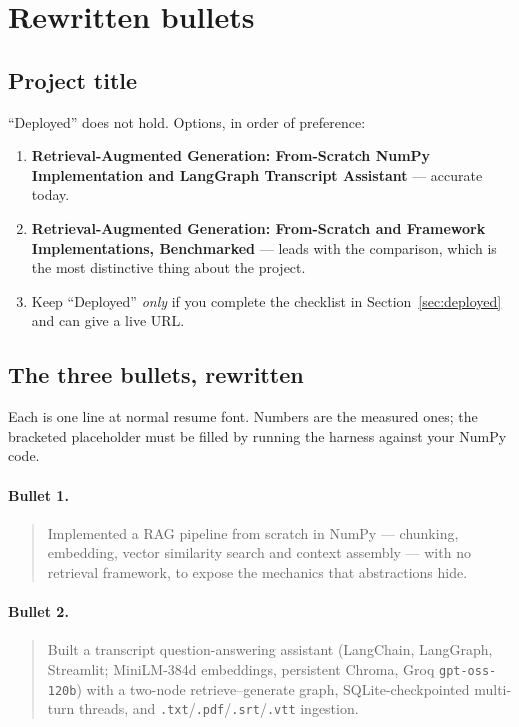 \documentclass[11pt,a4paper]{article}
\begin{document}
\section{Rewritten bullets}

\subsection{Project title}

``Deployed'' does not hold. Options, in order of preference:

\begin{enumerate}
  \item \textbf{Retrieval-Augmented Generation: From-Scratch NumPy Implementation
        and LangGraph Transcript Assistant} \quad --- accurate today.
  \item \textbf{Retrieval-Augmented Generation: From-Scratch and Framework
        Implementations, Benchmarked} \quad --- leads with the comparison, which is
        the most distinctive thing about the project.
  \item Keep ``Deployed'' \emph{only} if you complete the checklist in
        Section~\ref{sec:deployed} and can give a live URL.
\end{enumerate}

\subsection{The three bullets, rewritten}

Each is one line at normal resume font. Numbers are the measured ones; the bracketed
placeholder must be filled by running the harness against your NumPy code.

\paragraph{Bullet 1.}
\begin{quote}
Implemented a RAG pipeline from scratch in NumPy --- chunking, embedding,
vector similarity search and context assembly --- with no retrieval framework, to
expose the mechanics that abstractions hide.
\end{quote}

\paragraph{Bullet 2.}
\begin{quote}
Built a transcript question-answering assistant (LangChain, LangGraph, Streamlit;
MiniLM-384d embeddings, persistent Chroma, Groq \texttt{gpt-oss-120b}) with a
two-node retrieve--generate graph, SQLite-checkpointed multi-turn threads, and
\texttt{.txt}/\texttt{.pdf}/\texttt{.srt}/\texttt{.vtt} ingestion.
\end{quote}
\end{document}
